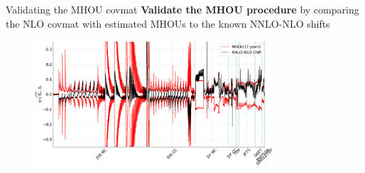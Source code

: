 \begin{frame}{Validating the MHOU covmat}
  \textbf{Validate the MHOU procedure} by comparing the NLO covmat with estimated MHOUs to the known NNLO-NLO shifts
  \begin{figure}[!t]
    \centering
      \includegraphics[width=0.8\textwidth]{figures/shift_validation.pdf}
  \end{figure}
\end{frame}


